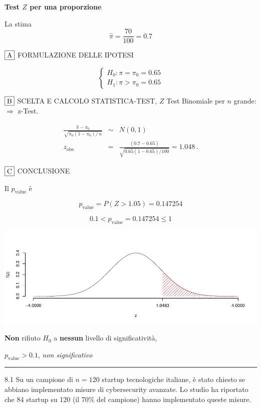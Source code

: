 \documentclass[
  11pt,
]{book}
\theoremstyle{mytheoremstyle}
\theoremstyle{mydefstyle}
\newenvironment{sol}
  {
  \begin{tcolorbox}[enhanced,breakable,arc=0.1mm,boxrule=1pt,colback=white,colframe=iblue,
  title=\bf \fontfamily{lmss}\selectfont \hspace{.5 cm} Soluzione,drop fuzzy shadow]

}{
\end{tcolorbox}
  }
\begin{document}
\begin{sol}
\textbf{Test \(Z\) per una proporzione}

La stima
\[\hat\pi=\frac { 70 } { 100 }= 0.7  \]

\(\fbox{A}\) FORMULAZIONE DELLE IPOTESI

\[\begin{cases}
   H_0: \pi = \pi_0=0.65 \\
   H_1: \pi > \pi_0=0.65 
   \end{cases}\]

\(\fbox{B}\) SCELTA E CALCOLO STATISTICA-TEST, \(Z\)
Test Binomiale per \(n\) grande: \(\Rightarrow\) z-Test.

\begin{eqnarray*}
   \frac{\hat\pi - \pi_{0}} {\sqrt {\pi_0(1-\pi_0)/\,n}}&\sim&N(0,1)\\
   z_{\text{obs}}
   &=& \frac{ ( 0.7 -  0.65 )} {\sqrt{ 0.65 (1- 0.65 )/ 100 }}
   =   1.048 \,.
   \end{eqnarray*}

\(\fbox{C}\) CONCLUSIONE

Il \(p_{\text{value}}\) è

\[ p_{\text{value}} = P(Z>1.05)=0.147254 \]

\[
 0.1 < p_\text{value}= 0.147254 \leq 1 
\]

\begin{center}\includegraphics{Esami_passati_con_soluzioni_files/figure-latex/05-test-21-1} \end{center}

\textbf{Non} rifiuto \(H_0\) a \textbf{nessun}
livello di significatività,

\(p_\text{value}>0.1\),
\emph{non significativo}

\end{sol}

\begin{center}\rule{0.5\linewidth}{0.5pt}\end{center}

8.1 Su un campione di \(n = 120\) startup tecnologiche italiane, è stato chiesto se abbiano implementato misure di cybersecurity avanzate. Lo studio ha riportato che 84 startup su 120 (il 70\% del campione) hanno implementato queste misure.
\end{document}
